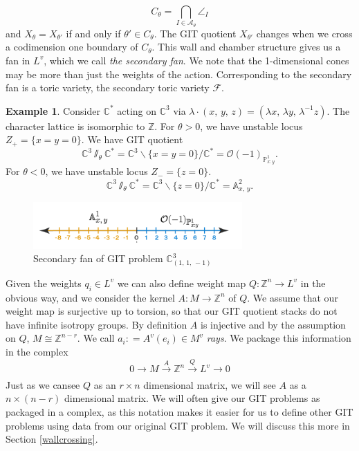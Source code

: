 \documentclass[oneside,reqno]{amsart}
\theoremstyle{definition}
\theoremstyle{definition}
\theoremstyle{definition}
\newtheorem{example}{Example} [section]
\theoremstyle{definition}
\newcommand{\defeq}{\mathrel{\mathop:}=}
\newcommand{\Z}{\mathbb{Z}}
\newcommand{\Fs}{\mathcal{F}}
\begin{document}
$$
C_\theta = \bigcap_{I \in \mathcal{A}_\theta} \angle_I
$$
and $X_\theta = X_{\theta'}$ if and only if $\theta' \in C_\theta$. The GIT quotient $X_{\theta'}$ changes when we cross a codimension one boundary of $C_{\theta}$. This wall and chamber structure gives us a fan in $L^v$, which we call \textit{the secondary fan}. We note that the 1-dimensional cones may be more than just the weights of the action. Corresponding to the secondary fan is a
toric variety, the secondary toric variety $\Fs$. 
\begin{example}
  Consider $\mathbb{C}^*$ acting on $\mathbb{C}^3$ via $\lambda \cdot (x, \, y, \, z) = (\lambda x,\, \lambda y, \, \lambda^{-1}z)$. The character lattice is isomorphic to $\mathbb{Z}$. For $\theta > 0$, we have unstable locus $Z_{+} = \{ x = y = 0 \}$. We have GIT quotient $$\mathbb{C}^3 \sslash_{\theta} \mathbb{C}^* = \mathbb{C}^3 \backslash{\{ x = y = 0 \}} / \mathbb{C}^* = \mathcal{O}(-1)_{\mathbb{P}^1_{x:y}}.$$
   For $\theta < 0$, we have unstable locus $Z_{-} = \{z = 0\}$.
   $$\mathbb{C}^3 \sslash_{\theta} \mathbb{C}^* = \mathbb{C}^3 \backslash{\{ z = 0 \}} / \mathbb{C}^* = \mathbb{A}^2_{x, \, y}.$$
   \begin{figure} [!h]
    \centering
    \includegraphics[width=8cm]{git/diffquotients.png}
    \caption{Secondary fan of GIT problem $\mathbb{C}^3_{(1, \, 1, \, -1 )}$}
  \end{figure}  
\end{example}
Given the weights $q_i \in L^v$ we can also define weight map $Q : \Z^n \to L^v$ in the obvious way, and we consider the kernel $A : M \to \Z^n$ of $Q$. We assume that our weight map is surjective up to torsion, so that our GIT quotient stacks do not have infinite isotropy groups. By definition $A$ is injective and by the assumption on $Q$, $M \cong \Z^{n-r}$. We call $a_i \defeq A^v(e_i) \in M^v $ \textit{rays}. We package this information in the complex
$$
0 \xrightarrow[]{} M \xrightarrow[]{A} \Z^n \xrightarrow[]{Q} L^v \xrightarrow[]{} 0
$$
Just as we cansee $Q$ as an $r\times n$ dimensional matrix, we will see $A$ as a $n \times (n-r)$ dimensional matrix.  We will often give our GIT problems as packaged in a complex, as this notation makes it easier for us to define other GIT problems using data from our original GIT problem. We will discuss this more in Section \ref{wallcrossing}.
\end{document}
